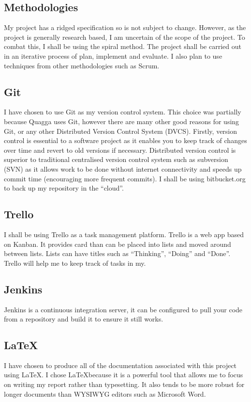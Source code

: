 \documentclass[12pt]{report}
\begin{document}
\subsection{Methodologies}
My project has a ridged specification so is not subject to change.
However, as the project is generally research based, I am uncertain of the scope
of the project. To combat this, I shall be using the spiral method. The project
shall be carried out in an iterative process of plan, implement and evaluate. I
also plan to use techniques from other methodologies such as Scrum. 

\subsection{Git}
I have chosen to use Git as my version control system. This choice was partially
because Quagga uses Git, however there are many other good reasons for using
Git, or any other Distributed Version Control System (DVCS).
 Firstly, version
control is essential to a software project as it enables you to keep track of
changes over time and revert to old versions if necessary. Distributed version
control is superior to traditional centralised version control system such as
subversion (SVN) as it allows work to be done without internet connectivity and
speeds up commit time (encouraging more frequent commits). I shall be
using bitbucket.org to back up my repository in the ``cloud''.

\subsection{Trello}
I shall be using Trello as a task management platform. Trello is a web app based
on Kanban. It provides card than can be placed into lists and moved around
between lists. Lists can have titles such as ``Thinking'', ``Doing'' and
``Done''. Trello will help me to keep track of tasks in my.

\subsection{Jenkins}
Jenkins is a continuous integration server, it can be configured to pull your
code from a repository and build it to ensure it still works.  

\subsection{\LaTeX}
I have chosen to produce all of the documentation associated with this project
using \LaTeX. I chose \LaTeX because it is a powerful tool that allows me to
focus on writing my report rather than typesetting. It also tends to be more
robust for longer documents than WYSIWYG editors such as Microsoft Word.
\end{document}
